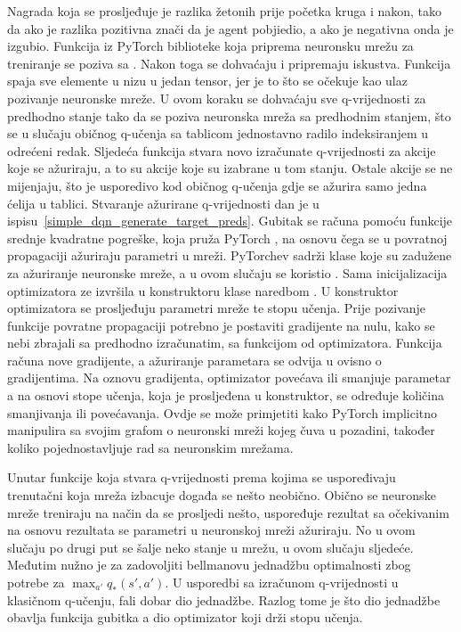 Nagrada koja se prosljeđuje je razlika žetonih prije početka kruga i nakon, tako da ako je razlika pozitivna znači da je agent pobjiedio, a ako je negativna onda je izgubio. Funkcija iz PyTorch biblioteke koja priprema neuronsku mrežu za treniranje se poziva sa . Nakon toga se dohvaćaju i pripremaju iskustva. Funkcija  spaja sve elemente u nizu u jedan tensor, jer je to što se očekuje kao ulaz pozivanje neuronske mreže. U ovom koraku se dohvaćaju sve q-vrijednosti za predhodno stanje tako da se poziva neuronska mreža sa predhodnim stanjem, što se u slučaju običnog q-učenja sa tablicom jednostavno radilo indeksiranjem u odrećeni redak. Sljedeća funkcija  stvara novo izračunate q-vrijednosti za akcije koje se ažuriraju, a to su akcije koje su izabrane u tom stanju. Ostale akcije se ne mijenjaju, što je usporedivo kod običnog q-učenja gdje se ažurira samo jedna ćelija u tablici. Stvaranje ažurirane q-vrijednosti dan je u ispisu~\ref{simple_dqn_generate_target_preds}. Gubitak se računa pomoću funkcije srednje kvadratne pogreške, koja pruža PyTorch , na osnovu čega se u povratnoj propagaciji ažuriraju parametri u mreži. PyTorchev  sadrži klase koje su zadužene za ažuriranje neuronske mreže, a u ovom slučaju se koristio . Sama inicijalizacija optimizatora ze izvršila u konstruktoru klase naredbom . U konstruktor optimizatora se prosljeđuju parametri mreže te stopu učenja. Prije pozivanje funkcije povratne propagaciji potrebno je postaviti gradijente na nulu, kako se nebi zbrajali sa predhodno izračunatim, sa funkcijom  od optimizatora. Funkcija  računa nove gradijente, a ažuriranje parametara se odvija u  ovisno o gradijentima. Na oznovu gradijenta, optimizator povećava ili smanjuje parametar a na osnovi stope učenja, koja je prosljeđena u konstruktor, se određuje količina smanjivanja ili povećavanja. Ovdje se može primjetiti kako PyTorch implicitno manipulira sa svojim grafom o neuronski mreži kojeg čuva u pozadini, također koliko pojednostavljuje rad sa neuronskim mrežama.


Unutar funkcije koja stvara q-vrijednosti prema kojima se uspoređivaju trenutačni koja mreža izbacuje događa se nešto neobično. Obično se neuronske mreže treniraju na način da se prosljedi nešto, uspoređuje rezultat sa očekivanim na osnovu rezultata se parametri u neuronskoj mreži ažuriraju. No u ovom slučaju po drugi put se šalje neko stanje u mrežu, u ovom slučaju sljedeće. Međutim nužno je za zadovoljiti bellmanovu jednadžbu optimalnosti zbog potrebe za $\max_{a'}q_*(s', a')$. U usporedbi sa izračunom q-vrijednosti u klasičnom q-učenju, fali dobar dio jednadžbe. Razlog tome je što dio jednadžbe obavlja funkcija gubitka a dio optimizator koji drži stopu učenja.

